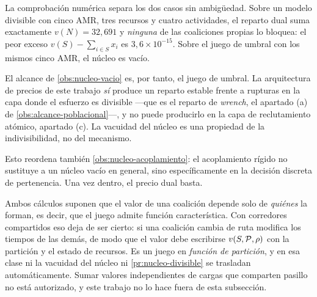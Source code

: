 \begin{observacion}
\label{obs:nucleo-dos-regimenes}
La comprobación numérica separa los dos casos sin ambigüedad. Sobre un modelo
divisible con cinco AMR, tres recursos y cuatro actividades, el reparto dual suma
exactamente $v(N)=32{,}691$ y \emph{ninguna} de las coaliciones propias lo
bloquea: el peor exceso $v(S)-\sum_{i\in S}x_i$ es $3{,}6\times10^{-15}$. Sobre
el juego de umbral con los mismos cinco AMR, el núcleo es vacío.

El alcance de \cref{obs:nucleo-vacio} es, por tanto, el juego de umbral. La arquitectura de
precios de este trabajo \emph{sí} produce un reparto estable frente a rupturas en
la capa donde el esfuerzo es divisible —que es el reparto de \emph{wrench}, el
apartado (a) de \cref{obs:alcance-poblacional}—, y no puede producirlo en la capa
de reclutamiento atómico, apartado (c). La vacuidad del núcleo es una propiedad
de la indivisibilidad, no del mecanismo.

Esto reordena también \cref{obs:nucleo-acoplamiento}: el acoplamiento rígido no
sustituye a un núcleo vacío en general, sino específicamente en la decisión
discreta de pertenencia. Una vez dentro, el precio dual basta.
\end{observacion}

\begin{observacion}
\label{obs:funcion-particion}
Ambos cálculos suponen que el valor de una coalición depende solo de \emph{quiénes}
la forman, es decir, que el juego admite función característica. Con corredores
compartidos eso deja de ser cierto: si una coalición cambia de ruta modifica los
tiempos de las demás, de modo que el valor debe escribirse $v(S,\mathcal{P},\rho)$ con
la partición y el estado de recursos. Es un juego en \emph{función de partición},
y en esa clase ni la vacuidad del núcleo ni \cref{pr:nucleo-divisible} se
trasladan automáticamente. Sumar valores independientes de cargas que comparten
pasillo no está autorizado, y este trabajo no lo hace fuera de esta subsección.
\end{observacion}

